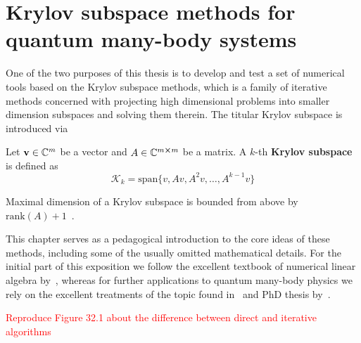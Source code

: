 
\chapter{Krylov subspace methods for quantum many-body systems}
\thispagestyle{chapterBeginStyle}

One of the two purposes of this thesis is to develop and test a set of numerical tools based on the Krylov subspace methods,
which is a family of iterative methods concerned with projecting high dimensional problems into smaller dimension subspaces
and solving them therein. The titular Krylov subspace is introduced via
\begin{definition}
	Let \(\vectorbold{v} \in \CC^{m}\) be a vector and \(A\in \mathbb{C}^{m\cross m}\) be a matrix. A \(k\)-th 
	\textbf{Krylov subspace} is defined as
	\begin{equation*}
		\mathcal{K}_k = \mathrm{span}\{v, Av, A^2v,\ldots,A^{k-1}v \}
	\end{equation*}
\end{definition}
Maximal dimension of a Krylov subspace is bounded from above by \(\mathrm{rank}(A) + 1\)~\autocite{Simoncini2015}.

This chapter serves as a
pedagogical introduction to the core ideas of these methods, including some of the usually omitted mathematical details.
For the initial part of this exposition we follow the excellent textbook of numerical linear algebra by~\textcite{Trefethen1997},
whereas for further applications to quantum many-body physics we rely on the excellent treatments of the topic
found in~\textcite{Sandvik2010} and PhD thesis by~\textcite{Crivelli2016}.

\textcolor{red}{Reproduce Figure 32.1 about the difference between direct and iterative algorithms}

